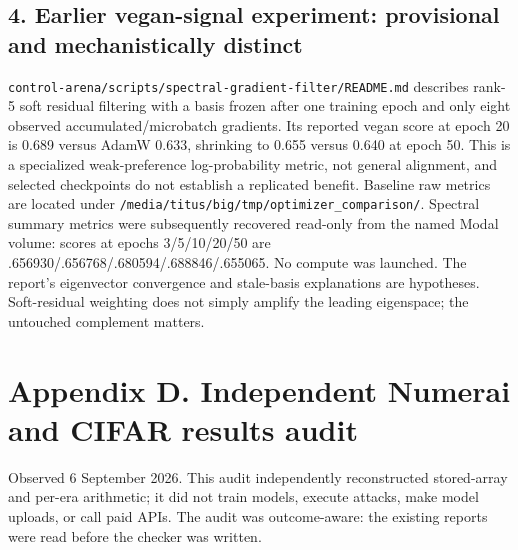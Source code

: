 \documentclass[
  british,
  10pt,
  a4paper,
]{article}
\begin{document}
\subsection{\texorpdfstring{4. Earlier vegan-\allowbreak{}signal
experiment: provisional and mechanistically
distinct}{4. Earlier  experiment: provisional and mechanistically distinct}}\label{external-studies--earlier-vegan-signal-experiment-provisional-and-mechanistically-distinct}

\texttt{control-\allowbreak{}arena/\allowbreak{}scripts/\allowbreak{}spectral-\allowbreak{}gradient-\allowbreak{}filter/\allowbreak{}README.\allowbreak{}md}
describes rank-5 soft residual filtering with a basis frozen after one
training epoch and only eight observed
accumulated/\allowbreak{}microbatch gradients. Its reported vegan score
at epoch 20 is 0.689 versus AdamW 0.633, shrinking to 0.655 versus 0.640
at epoch 50. This is a specialized weak-\allowbreak{}preference
log-\allowbreak{}probability metric, not general alignment, and selected
checkpoints do not establish a replicated benefit. Baseline raw metrics
are located under
\texttt{/\allowbreak{}media/\allowbreak{}titus/\allowbreak{}big/\allowbreak{}tmp/\allowbreak{}optimizer\_\allowbreak{}comparison/\allowbreak{}}.
Spectral summary metrics were subsequently recovered read-only from the
named Modal volume: scores at epochs
3/\allowbreak{}5/\allowbreak{}10/\allowbreak{}20/\allowbreak{}50 are
.\allowbreak{}656930/\allowbreak{}.\allowbreak{}656768/\allowbreak{}.\allowbreak{}680594/\allowbreak{}.\allowbreak{}688846/\allowbreak{}.\allowbreak{}655065.\allowbreak{}
No compute was launched. The report's eigenvector convergence and
stale-\allowbreak{}basis explanations are hypotheses.\allowbreak{}
Soft-\allowbreak{}residual weighting does not simply amplify the leading
eigenspace; the untouched complement matters.

\clearpage

\section{Appendix D. Independent Numerai and CIFAR results
audit}\label{external-results-audit}

Observed 6 September 2026. This audit independently reconstructed
stored-\allowbreak{}array and per-era arithmetic; it did not train
models, execute attacks, make model uploads, or call paid APIs. The
audit was outcome-\allowbreak{}aware:\allowbreak{} the existing reports
were read before the checker was written.
\end{document}

